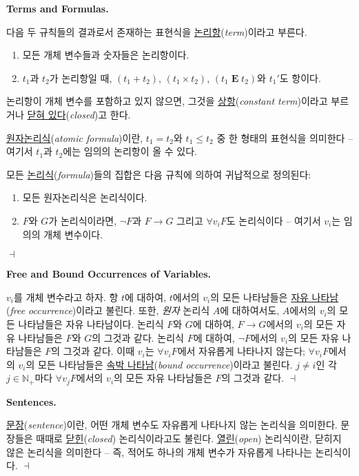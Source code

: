 \documentclass[12pt]{paper}
\newenvironment{context}[1][]
{ \noindent \textbf{{#1}.}
}
{ \hfill $ \dashv $ }
\begin{document}
\begin{context}[Terms and Formulas]
다음 두 규칙들의 결과로서 존재하는 표현식을 \underline{논리항}(\textit{term})이라고 부른다.
\begin{enumerate}
\item 모든 개체 변수들과 숫자들은 논리항이다.
\item $t_{1}$과 $t_{2}$가 논리항일 때, $\left( t_{1} + t_{2} \right)$, $\left( t_{1} \times t_{2} \right)$, $\left( t_{1} \mathop{\mathbf{E}} t_{2} \right)$와 $t_{1} '$도 항이다.
\end{enumerate}

논리항이 개체 변수를 포함하고 있지 않으면, 그것을 \underline{상항}(\textit{constant term})이라고 부르거나 \underline{닫혀 있다}(\textit{closed})고 한다.

\underline{원자논리식}(\textit{atomic formula})이란,
$t_{1} = t_{2}$와 $t_{1} \leq t_{2}$ 중 한 형태의 표현식을 의미한다 --
여기서 $t_{1}$과 $t_{2}$에는 임의의 논리항이 올 수 있다.

모든 \underline{논리식}(\textit{formula})들의 집합은 다음 규칙에 의하여 귀납적으로 정의된다:
\begin{enumerate}
\item 모든 원자논리식은 논리식이다.
\item $F$와 $G$가 논리식이라면, $\lnot F$과 $F \rightarrow G$ 그리고 $\forall v_{i} F$도 논리식이다 --
여기서 $v_{i}$는 임의의 개체 변수이다.
\end{enumerate}
\end{context}

\begin{context}[Free and Bound Occurrences of Variables]
$v_{i}$를 개체 변수라고 하자.
항 $t$에 대하여, $t$에서의 $v_{i}$의 모든 나타남들은 \underline{자유 나타남}(\textit{free occurrence})이라고 불린다.
또한, \textit{원자} 논리식 $A$에 대하여서도, $A$에서의 $v_{i}$의 모든 나타남들은 자유 나타남이다.
논리식 $F$와 $G$에 대하여, $F \rightarrow G$에서의 $v_{i}$의 모든 자유 나타남들은 $F$와 $G$의 그것과 같다.
논리식 $F$에 대하여, $\lnot F$에서의 $v_{i}$의 모든 자유 나타남들은 $F$의 그것과 같다.
이때 $v_{i}$는 $\forall v_{i} F$에서 자유롭게 나타나지 않는다;
$\forall v_{i} F$에서의 $v_{i}$의 모든 나타남들은 \underline{속박 나타남}(\textit{bound occurrence})이라고 불린다.
$j \neq i$인 각 $j \in \mathbb{N}_{+}$마다 $\forall v_{j} F$에서의 $v_{i}$의 모든 자유 나타남들은 $F$의 그것과 같다.
\end{context}

\begin{context}[Sentences]
\underline{문장}(\textit{sentence})이란, 어떤 개체 변수도 자유롭게 나타나지 않는 논리식을 의미한다.
문장들은 때때로 \underline{닫힌}(\textit{closed}) 논리식이라고도 불린다.
\underline{열린}(\textit{open}) 논리식이란, 닫히지 않은 논리식을 의미한다 --
즉, 적어도 하나의 개체 변수가 자유롭게 나타나는 논리식이다.
\end{context}
\end{document}
